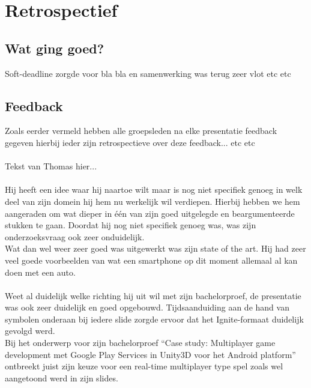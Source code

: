 \documentclass[fleqn,10pt]{voorstel}
\begin{document}
\section{Retrospectief}
\subsection{Wat ging goed?}
Soft-deadline zorgde voor bla bla en samenwerking was terug zeer vlot etc etc

\subsection{Feedback}
Zoals eerder vermeld hebben alle groepsleden na elke presentatie feedback gegeven hierbij ieder zijn retrospectieve over deze feedback... etc etc

\paragraph{\cite{VanSevenant2016}}
Tekst van Thomas hier...

\paragraph{\cite{Willems2016}}
Hij heeft een idee waar hij naartoe wilt maar is nog niet specifiek genoeg in welk deel van zijn domein hij hem nu werkelijk wil verdiepen. Hierbij hebben we hem aangeraden om wat dieper in één van zijn goed uitgelegde en beargumenteerde stukken te gaan. Doordat hij nog niet specifiek genoeg was, was zijn onderzoeksvraag ook zeer onduidelijk.\\
Wat dan wel weer zeer goed was uitgewerkt was zijn state of the art. Hij had zeer veel goede voorbeelden van wat een smartphone op dit moment allemaal al kan doen met een auto.

\paragraph{\cite{Pinsard2016}}
Weet al duidelijk welke richting hij uit wil met zijn bachelorproef, de presentatie was ook zeer duidelijk en goed opgebouwd. Tijdsaanduiding aan de hand van symbolen onderaan bij iedere slide zorgde ervoor dat het Ignite-formaat duidelijk gevolgd werd.\\
Bij het onderwerp voor zijn bachelorproef “Case study: Multiplayer game development met Google Play Services in Unity3D voor het Android platform” ontbreekt juist zijn keuze voor een real-time multiplayer type spel zoals wel aangetoond werd in zijn slides.
\end{document}
